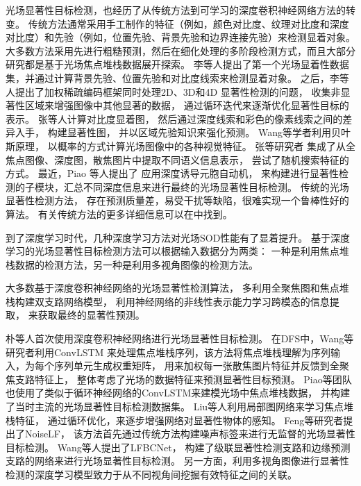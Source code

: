 


光场显著性目标检测，也经历了从传统方法到可学习的深度卷积神经网络方法的转变。
传统方法通常采用手工制作的特征（例如，颜色对比度、纹理对比度和深度对比度）和先验（例如，位置先验、背景先验和边界连接先验）来检测显着对象。 
大多数方法采用先进行粗糙预测，然后在细化处理的多阶段检测方式，而且大部分研究都是基于光场焦点堆栈数据展开探索。
%
%
李等人提出了第一个光场显着性数据集，并通过计算背景先验、位置先验和对比度线索来检测显着对象。
之后，李等人提出了加权稀疏编码框架同时处理2D、3D和4D 显著性检测的问题，
收集非显著性区域来增强图像中其他显著的数据，
通过循环迭代来逐渐优化显著性目标的表示。
张等人计算对比度显着图，
然后通过深度线索和彩色的像素线索之间的差异入手，
构建显著性图，
并以区域先验知识来强化预测。
Wang等学者利用贝叶斯原理，
以概率的方式计算光场图像中的各种视觉特征。
张等研究者
集成了从全焦点图像、深度图，散焦图片中提取不同语义信息表示，
尝试了随机搜索特征的方式。
最近，Piao 等人提出了
应用深度诱导元胞自动机，
来构建进行显著性检测的子模块，汇总不同深度信息来进行最终的光场显著性目标检测。
传统的光场显著性检测方法，
存在预测质量差，易受干扰等缺陷，很难实现一个鲁棒性好的算法。
有关传统方法的更多详细信息可以在中找到。





到了深度学习时代，几种深度学习方法对光场SOD性能有了显着提升。 
基于深度学习的光场显著性目标检测方法可以根据输入数据分为两类：
一种是利用焦点堆栈数据的检测方法，另一种是利用多视角图像的检测方法。



大多数基于深度卷积神经网络的光场显著性检测算法，
多利用全聚焦图和焦点堆栈构建双支路网络模型，
利用神经网络的非线性表示能力学习跨模态的信息提取，
来获取最终的显著性预测。


朴等人首次使用深度卷积神经网络进行光场显著性目标检测。
在DFS中，Wang等研究者利用ConvLSTM
来处理焦点堆栈序列，该方法将焦点堆栈理解为序列输入，为每个序列单元生成权重矩阵，
用来加权每一张散焦图片特征并反馈到全聚焦支路特征上，
整体考虑了光场的数据特征来预测显著性目标预测。
Piao等团队也使用了类似于循环神经网络的ConvLSTM来建模光场中焦点堆栈数据，
并构建了当时主流的光场显著性目标检测数据集。
Liu等人利用局部图网络来学习焦点堆栈特征，
通过循环优化，来逐步增强网络对显著性物体的感知。
Feng等研究者提出了NoiseLF，
该方法首先通过传统方法构建噪声标签来进行无监督的光场显著性目标检测。
Wang等人提出了LFBCNet，
构建了级联显著性检测支路和边缘预测支路的网络来进行光场显著性目标检测。
另一方面，利用多视角图像进行显著性检测的深度学习模型致力于从不同视角间挖掘有效特征之间的关联。



